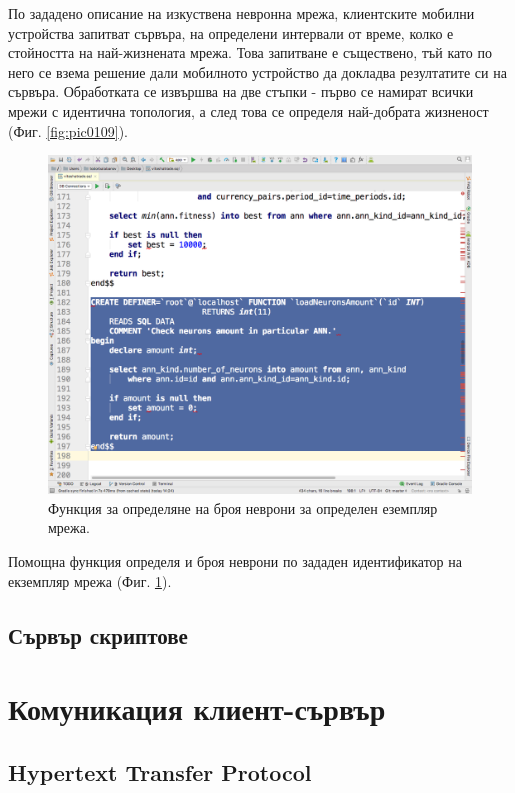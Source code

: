 \documentclass[book,14pt,oneside,openany]{memoir}
\begin{document}
По зададено описание на изкуствена невронна мрежа, клиентските мобилни устройства запитват сървъра, на определени интервали от време, колко е стойността на най-жизнената мрежа. Това запитване е съществено, тъй като по него се взема решение дали мобилното устройство да докладва резултатите си на сървъра. Обработката се извършва на две стъпки - първо се намират всички мрежи с идентична топология, а след това се определя най-добрата жизненост (Фиг. \ref{fig:pic0109}).

\begin{figure}[h]
  \centering
  \includegraphics[height=0.45\pdfpageheight]{pic0110}
  \caption{Функция за определяне на броя неврони за определен еземпляр мрежа.}
\label{fig:pic0110}
\end{figure}
\FloatBarrier

Помощна функция определя и броя неврони по зададен идентификатор на екземпляр мрежа (Фиг. \ref{fig:pic0110}).

\section{Сървър скриптове}

\newpage
\chapter{Комуникация клиент-сървър}
\label{chapter06}

\section{Hypertext Transfer Protocol}
\end{document}
